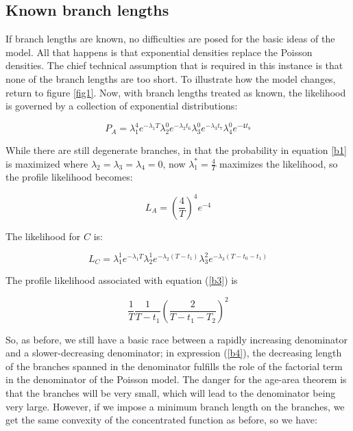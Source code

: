 \documentclass[11pt]{article}
\begin{document}
{ 


\subsection{Known branch lengths}

If branch lengths are known, no difficulties are posed for the basic ideas of the model. All that happens is that exponential densities replace the Poisson densities. The chief technical assumption that is required in this instance is that none of the branch lengths are too short. To illustrate how the model changes, return to figure  \ref{fig1}. Now, with branch lengths treated as known, the likelihood is governed by a collection of exponential distributions:

\begin{equation} \label{b1}
P_A = \lambda_1^4e^{-\lambda_1T}\lambda_2^0e^{-\lambda_2t_6}\lambda_3^0e^{-\lambda_3t_7}\lambda_4 ^0e^{-4t_8}
\end{equation} 

While there are still degenerate branches, in that the probability in equation \ref{b1} is maximized where $\lambda_2=\lambda_3=\lambda_4=0$, now $\lambda_1^*=\frac{4}{T}$ maximizes the likelihood, so the profile likelihood becomes:

\begin{equation} \label{b2}
L_A=\left(\frac{4}{T}\right)^4e^{-4}
\end{equation}

The likelihood for $C$ is:

\begin{equation} \label{b3}
L_{C}=\lambda_1^1e^{-\lambda_1T}\lambda_2^1e^{-\lambda_2(T-t_1)}
\lambda_3^2e^{-\lambda_3(T-t_0-t_1)}
\end{equation}

The profile likelihood associated with equation (\ref{b3}) is 

\begin{equation} \label{b4}
\frac{1}{T}\frac{1}{T-t_1}\left(\frac{2}{T-t_1-T_2}\right)^2
\end{equation}

So, as before, we still have a basic race between a rapidly increasing denominator and a slower-decreasing denominator; in expression (\ref{b4}), the decreasing length of the branches spanned in the denominator fulfills the role of the factorial term in the denominator of the Poisson model. The danger for the age-area theorem is that the branches will be very small, which will lead to the denominator being very large. However, if we impose a minimum branch length on the branches, we get the same convexity of the concentrated function as before, so we have:

}
\end{document}
